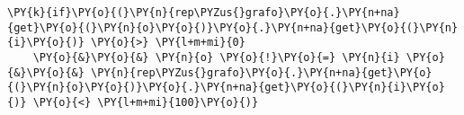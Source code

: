 \begin{Verbatim}[commandchars=\\\{\}]
 \PY{k}{if}\PY{o}{(}\PY{n}{rep\PYZus{}grafo}\PY{o}{.}\PY{n+na}{get}\PY{o}{(}\PY{n}{o}\PY{o}{)}\PY{o}{.}\PY{n+na}{get}\PY{o}{(}\PY{n}{i}\PY{o}{)} \PY{o}{>} \PY{l+m+mi}{0} 
    \PY{o}{&}\PY{o}{&} \PY{n}{o} \PY{o}{!}\PY{o}{=} \PY{n}{i} \PY{o}{&}\PY{o}{&} \PY{n}{rep\PYZus{}grafo}\PY{o}{.}\PY{n+na}{get}\PY{o}{(}\PY{n}{o}\PY{o}{)}\PY{o}{.}\PY{n+na}{get}\PY{o}{(}\PY{n}{i}\PY{o}{)} \PY{o}{<} \PY{l+m+mi}{100}\PY{o}{)}
\end{Verbatim}
